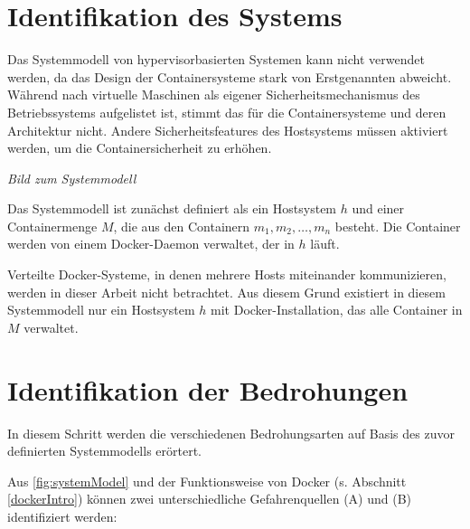\documentclass[../main.tex]{subfiles}
\begin{document}
  \section{Identifikation des Systems}
    Das Systemmodell von hypervisorbasierten Systemen kann nicht verwendet werden, da das Design der Containersysteme stark von Erstgenannten abweicht. Während nach \cite[S.125]{CISSP} virtuelle Maschinen als eigener Sicherheitsmechanismus des Betriebssystems aufgelistet ist, stimmt das für die Containersysteme und deren Architektur nicht. Andere Sicherheitsfeatures des Hostsystems müssen aktiviert werden, um die Containersicherheit zu erhöhen.

    \emph{Bild zum Systemmodell}

    Das Systemmodell ist zunächst definiert als ein Hostsystem \(h\) und einer Containermenge \(M\), die aus den Containern \(m_1,m_2,\dotsc,m_n\) besteht. Die Container werden von einem Docker-Daemon verwaltet, der in \(h\) läuft.

    Verteilte Docker-Systeme, in denen mehrere Hosts miteinander kommunizieren, werden in dieser Arbeit nicht betrachtet. Aus diesem Grund existiert in diesem Systemmodell nur ein Hostsystem \(h\) mit Docker-Installation, das alle Container in \(M\) verwaltet.

  \section{Identifikation der Bedrohungen}
    In diesem Schritt werden die verschiedenen Bedrohungsarten auf Basis des zuvor definierten Systemmodells erörtert.

    Aus \fig \ref{fig:systemModel} und der Funktionsweise von Docker (s. Abschnitt \ref{dockerIntro}) können zwei unterschiedliche Gefahrenquellen (A) und (B) identifiziert werden:
\end{document}
